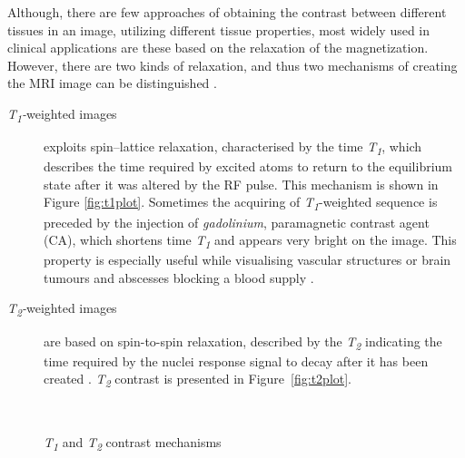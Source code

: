 Although, there are few approaches of obtaining the contrast between different tissues in an image, utilizing different tissue properties, most widely used in clinical applications are these based on the relaxation of the magnetization. However, there are two kinds of relaxation, and thus two mechanisms of creating the MRI image can be distinguished \cite{biomedical_hanbook_imaging}.
\begin{description}
		\item [\textit{T\textsubscript{1}-}weighted images] exploits spin–lattice relaxation, characterised by the time \textit{T\textsubscript{1}}, which describes the time required by excited atoms to return to the equilibrium state after it was altered by the RF pulse. This mechanism is shown in Figure \ref{fig:t1plot}. Sometimes the acquiring of \textit{T\textsubscript{1}}-weighted sequence is preceded by the injection of \textit{gadolinium}, paramagnetic contrast agent (CA), which  shortens time \textit{T\textsubscript{1}} and appears very bright on the image. This property is especially useful while visualising vascular structures or brain tumours and abscesses blocking a blood supply \cite{biomedical_hanbook_imaging, grover2015magnetic}.   
		
		\item [\textit{T\textsubscript{2}-}weighted images] are based on spin-to-spin relaxation, described by the \textit{T\textsubscript{2}} indicating the time required by the nuclei response signal to decay after it has been created \cite{biomedical_hanbook_imaging, grover2015magnetic}. \textit{T\textsubscript{2}} contrast is presented in Figure~\ref{fig:t2plot}. 
\end{description}
\begin{figure}[H]
\captionsetup[subfloat]{captionskip=0.5cm}
	\centering
	\hspace{1.5cm}
	\\	
\vspace{0.5cm}
\caption[\textit{T\textsubscript{1}} and \textit{T\textsubscript{2}} contrast mechanisms]{\textit{T\textsubscript{1}} and \textit{T\textsubscript{2}} contrast mechanisms \cite{biomedical_hanbook_imaging}}
\label{fig:t1t2plot}
\end{figure}

